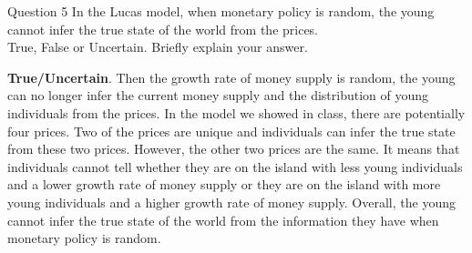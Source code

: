 \documentclass[a4paper]{article}
\newif\IfInSansMode
\numberwithin{equation}{section}
\numberwithin{figure}{section}
\begin{document}
	\begin{questionbox}{Question 5}
		In the Lucas model, when monetary policy is random, the young cannot infer the true state of the world from the prices.\\
		True, False or Uncertain. Briefly explain your answer.
		\begin{explanationbox}
			\textbf{True/Uncertain}. Then the growth rate of money supply is random, the young can no longer infer the current money supply and the distribution of young individuals from the prices. In the model we showed in class, there are potentially four prices. Two of the prices are unique and individuals can infer the true state from these two prices. However, the other two prices are the same. It means that individuals cannot tell whether they are on the island with less young individuals and a lower growth rate of money supply or they are on the island with more young individuals and a higher growth rate of money supply. Overall, the young cannot infer the true state of the world from the information they have when monetary policy is random.
		\end{explanationbox}
	\end{questionbox}
\end{document}
